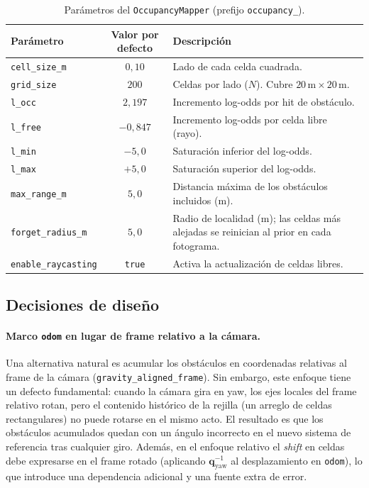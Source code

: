 \begin{table}[ht]
  \centering
  \caption{Parámetros del \texttt{OccupancyMapper} (prefijo \texttt{occupancy\_}).}
  \label{tab:v5-params}
  \small
  \begin{tabular}{lcp{7cm}}
    \hline
    \textbf{Parámetro} & \textbf{Valor por defecto} & \textbf{Descripción} \\
    \hline
    \texttt{cell\_size\_m}        & $0{,}10$  & Lado de cada celda cuadrada. \\
    \texttt{grid\_size}           & $200$     & Celdas por lado ($N$). Cubre $20\,\text{m}\times20\,\text{m}$. \\
    \texttt{l\_occ}               & $2{,}197$ & Incremento log-odds por hit de obstáculo. \\
    \texttt{l\_free}              & $-0{,}847$ & Incremento log-odds por celda libre (rayo). \\
    \texttt{l\_min}               & $-5{,}0$  & Saturación inferior del log-odds. \\
    \texttt{l\_max}               & $+5{,}0$  & Saturación superior del log-odds. \\
    \texttt{max\_range\_m}        & $5{,}0$   & Distancia máxima de los obstáculos incluidos (m). \\
    \texttt{forget\_radius\_m}    & $5{,}0$   & Radio de localidad (m); las celdas más alejadas se reinician al prior en cada fotograma. \\
    \texttt{enable\_raycasting}   & \texttt{true} & Activa la actualización de celdas libres. \\
    \hline
  \end{tabular}
\end{table}

\subsection{Decisiones de diseño}
\label{subsec:lm-v5-design}

\paragraph{Marco \texttt{odom} en lugar de frame relativo a la cámara.}
Una alternativa natural es acumular los obstáculos en coordenadas relativas
al frame de la cámara (\texttt{gravity\_aligned\_frame}). Sin embargo, este
enfoque tiene un defecto fundamental: cuando la cámara gira en yaw, los ejes
locales del frame relativo rotan, pero el contenido histórico de la rejilla
(un arreglo de celdas rectangulares) no puede rotarse en el mismo acto. El
resultado es que los obstáculos acumulados quedan con un ángulo incorrecto en
el nuevo sistema de referencia tras cualquier giro. Además, en el enfoque
relativo el \emph{shift} en celdas debe expresarse en el frame rotado
(aplicando $\mathbf{q}_{\text{yaw}}^{-1}$ al desplazamiento en \texttt{odom}),
lo que introduce una dependencia adicional y una fuente extra de error.

